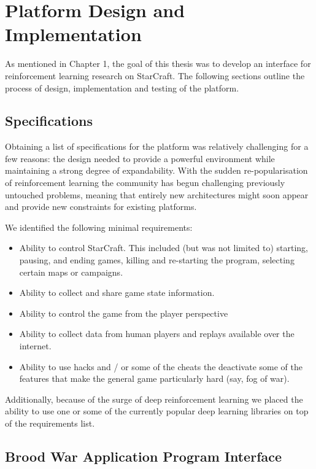 \chapter{Platform Design and Implementation}

As mentioned in Chapter 1, the goal of this thesis was to develop an interface
for reinforcement learning research on StarCraft. The following sections
outline the process of design, implementation and testing of the platform.

\section{Specifications}

Obtaining a list of specifications for the platform was relatively challenging
for a few reasons: the design needed to provide a powerful environment while
maintaining a strong degree of expandability. With the sudden re-popularisation
of reinforcement learning the community has begun challenging previously
untouched problems, meaning that entirely new architectures might soon appear
and provide new constraints for existing platforms.

We identified the following minimal requirements:

\begin{itemize}
\item Ability to control StarCraft. This included (but was not limited to)
  starting, pausing, and ending games, killing and re-starting the program,
  selecting certain maps or campaigns.
\item Ability to collect and share game state information.
\item Ability to control the game from the player perspective
\item Ability to collect data from human players and replays available over the
  internet.
\item Ability to use hacks and / or some of the cheats the deactivate some of the
  features that make the general game particularly hard (say, fog of war). 
\end{itemize}

Additionally, because of the surge of deep reinforcement learning we placed the
ability to use one or some of the currently popular deep learning libraries on
top of the requirements list.


\section{Brood War Application Program Interface}

